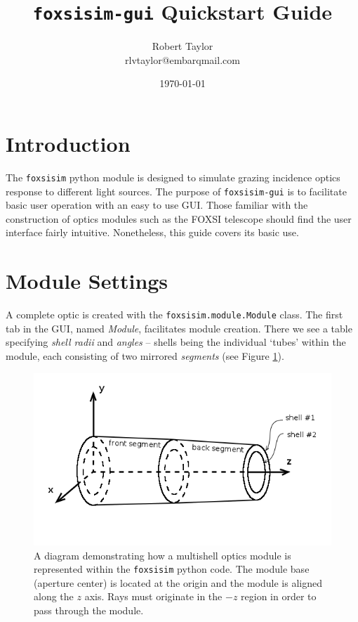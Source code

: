 \documentclass[12pt]{article}
\title{\texttt{foxsisim-gui} Quickstart Guide}
\author{Robert Taylor\\\small{rlvtaylor@embarqmail.com}}
\date{\today}
\begin{document}
\maketitle
\newpage


\section*{Introduction}

The \texttt{foxsisim} python module is designed to simulate grazing incidence optics response to different light sources. The purpose of \texttt{foxsisim-gui} is to facilitate basic user operation with an easy to use GUI. Those familiar with the construction of optics modules such as the FOXSI telescope should find the user interface fairly intuitive. Nonetheless, this guide covers its basic use.


\section*{Module Settings}

A complete optic is created with the \texttt{foxsisim.module.Module} class. The first tab in the GUI, named \textit{Module}, facilitates module creation. There we see a table specifying \textit{shell radii} and \textit{angles} -- shells being the individual `tubes' within the module, each consisting of two mirrored \textit{segments} (see Figure \ref{fig:module}). 

\begin{figure}[ht]
\centering
	\includegraphics[scale=0.6]{figures/module.png}
\caption{\small A diagram demonstrating how a multishell optics module is represented within the \texttt{foxsisim} python code. The module base (aperture center) is located at the origin and the module is aligned along the $z$ axis. Rays must originate in the $-z$ region in order to pass through the module.}
\label{fig:module}
\end{figure}
\end{document}
